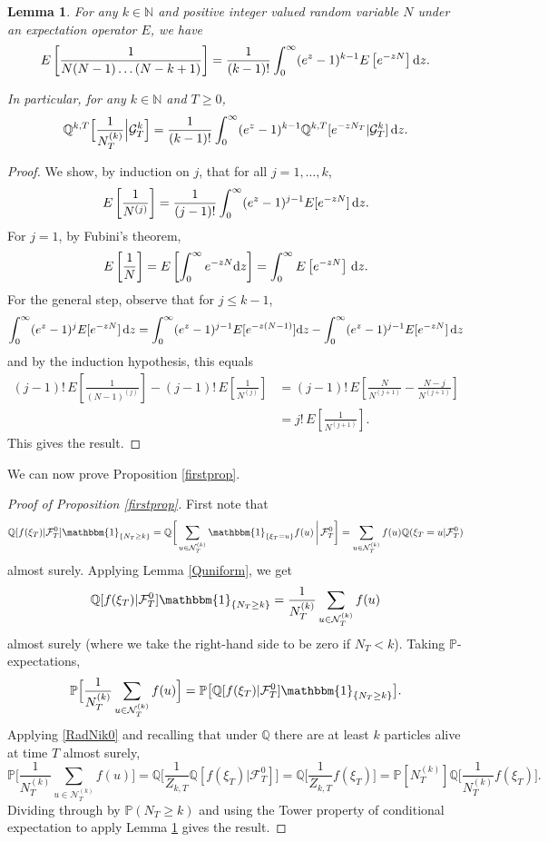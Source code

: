 \documentclass{article}
\theoremstyle{plain}
\newtheorem{lem}[thm]{Lemma}
\theoremstyle{definition}
\newcommand{\Q}{\mathbb{Q}}
\renewcommand{\P}{\mathbb{P}}
\newcommand{\F}{\mathcal{F}}
\newcommand{\G}{\mathcal{G}}
\newcommand{\ind}{\mathbbm{1}}
\newcommand{\Nc}{\mathcal{N}}
\renewcommand{\d}{{\rm{d}}}
\newcommand{\N}{\mathbb{N}}
\begin{document}
\begin{lem}\label{recip}
For any $k\in\N$ and positive integer valued random variable $N$ under an expectation operator $E$, we have
\[
E \left[\frac{1}{N(N-1)\dots(N-k+1)}\right]
= \frac{1}{(k-1)!} \int_0^\infty (e^z-1)^{k-1} E\left[e^{-zN}\right] \d z.
\]

In particular, for any $k\in\N$ and $T\ge 0$,
\[\Q^{k,T}\Big[\frac{1}{N_T^{(k)}}\Big|\G^k_T\Big] = \frac{1}{(k-1)!} \int_0^\infty (e^z-1)^{k-1}\Q^{k,T}[e^{-zN_T}|\G^k_T]\, \d z.\]
\end{lem}

\begin{proof}
We show, by induction on $j$, that for all $j=1,\ldots,k$,
\[E\left[\frac{1}{N^{(j)}}\right] = \frac{1}{(j-1)!} \int_0^\infty (e^z-1)^{j-1}E[e^{-zN}]\, \d z.\]
For $j=1$, by Fubini's theorem,
\[E\left[\frac{1}{N}\right] = E\left[\int_0^\infty e^{-zN} \d z \right] = \int_0^\infty E\left[e^{-zN}\right]\, \d z.\]
For the general step, observe that for $j\le k-1$,
\begin{multline*}
\int_0^\infty (e^z-1)^j E[e^{-zN}]\,\d z 
= \int_0^\infty (e^z-1)^{j-1}E[e^{-z(N-1)}]\d z - \int_0^\infty (e^z-1)^{j-1}E[e^{-zN}]\,\d z
\end{multline*}
and by the induction hypothesis, this equals
\begin{align*}
(j-1)!\,E\left[\frac{1}{(N-1)^{(j)}}\right] - (j-1)!\,E\left[\frac{1}{N^{(j)}}\right]
&= (j-1)! \,E\left[ \frac{N}{N^{(j+1)}} - \frac{N-j}{N^{(j+1)}} \right]\\
&= j!\,E\left[\frac{1}{N^{(j+1)}}\right].
\end{align*}
This gives the result.
\end{proof}


We can now prove Proposition \ref{firstprop}.

\begin{proof}[Proof of Proposition \ref{firstprop}]
First note that
\[\Q[f(\xi_T)|\F^0_T]\ind_{\{N_T\ge k\}} = \Q\bigg[ \sum_{u\in \Nc_T^{(k)}} \ind_{\{\xi_T = u\}} f(u)\, \bigg|\,\F^0_T\bigg] = \sum_{u\in \Nc_T^{(k)}} f(u) \Q(\xi_T = u | \F^0_T)\]
almost surely. Applying Lemma \ref{Quniform}, we get
\[\Q[f(\xi_T)|\F^0_T]\ind_{\{N_T\ge k\}} = \frac{1}{N_T^{(k)}}\sum_{u\in \Nc_T^{(k)}} f(u)\]
almost surely (where we take the right-hand side to be zero if $N_T < k$). Taking $\P$-expectations,
\[\P\Big[\frac{1}{N_T^{(k)}}\sum_{u\in \Nc_T^{(k)}} f(u)\Big] = \P\big[\Q[f(\xi_T)|\F^0_T]\ind_{\{N_T\ge k\}}\big].\]
Applying \eqref{RadNik0} and recalling that under $\Q$ there are at least $k$ particles alive at time $T$ almost surely,
\begin{equation}\label{subfirstprop}
\P\Big[\frac{1}{N_T^{(k)}}\sum_{u\in \Nc_T^{(k)}} f(u)\Big] = \Q\Big[\frac{1}{Z_{k,T}}\Q[f(\xi_T)|\F^0_T]\Big] = \Q\Big[\frac{1}{Z_{k,T}}f(\xi_T)\Big] = \P[N_T^{(k)}]\Q\Big[\frac{1}{N_T^{(k)}}f(\xi_T)\Big].
\end{equation}
Dividing through by $\P(N_T\ge k)$ and using the Tower property of conditional expectation to apply Lemma \ref{recip}  gives the result.
\end{proof}
\end{document}
